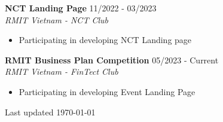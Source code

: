 \documentclass[11pt]{article}
\newcommand{\project}[2]{
    \begingroup
        \textbf{\small#1}
        \hfill\color{black!70}\small{#2}
    \endgroup
}
\newcommand{\spacevv}{
    \vspace{2mm}
}
\begin{document}
\begin{paracol}{2}
{          \project{NCT Landing Page}{11/2022 - 03/2023} \\
          \textcolor{black!70}{\textit{RMIT Vietnam - NCT Club}}
          \vspace{1mm} 
          \begin{itemize}
            \item Participating in developing NCT Landing page 
          \end{itemize}
          \spacevv
        
          \project{RMIT Business Plan Competition}{05/2023 - Current} \\
          \textcolor{black!70}{\textit{RMIT Vietnam - FinTect Club}}
          \vspace{1mm} 
          \begin{itemize}
            \item Participating in developing Event Landing Page 
          \end{itemize}
          \spacevv
    
    }

    \normaltext \hfill \tiny Last updated \today

    \end{paracol}
\end{document}
